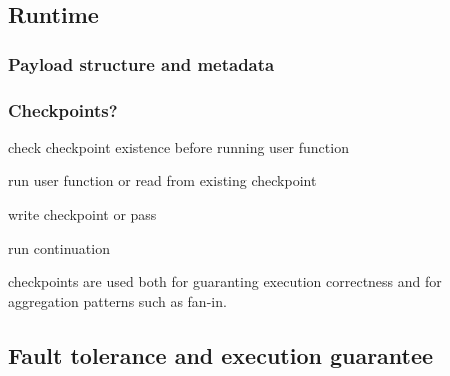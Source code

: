 \subsection{Runtime}


\subsubsection{Payload structure and metadata}


\subsubsection{Checkpoints?}


check checkpoint existence before running user function

run user function or read from existing checkpoint

write checkpoint or pass

run continuation

checkpoints are used both for guaranting execution correctness and for
aggregation patterns such as fan-in.


\subsection{Fault tolerance and execution guarantee}

